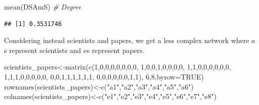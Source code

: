 \documentclass[
  notitlepage,
  onecolumn,
  openany]{book}
\newenvironment{Shaded}{\begin{snugshade}}{\end{snugshade}}
\newcommand{\AttributeTok}[1]{\textcolor[rgb]{0.77,0.63,0.00}{#1}}
\newcommand{\CommentTok}[1]{\textcolor[rgb]{0.56,0.35,0.01}{\textit{#1}}}
\newcommand{\ConstantTok}[1]{\textcolor[rgb]{0.00,0.00,0.00}{#1}}
\newcommand{\DecValTok}[1]{\textcolor[rgb]{0.00,0.00,0.81}{#1}}
\newcommand{\FunctionTok}[1]{\textcolor[rgb]{0.00,0.00,0.00}{#1}}
\newcommand{\NormalTok}[1]{#1}
\newcommand{\OtherTok}[1]{\textcolor[rgb]{0.56,0.35,0.01}{#1}}
\newcommand{\StringTok}[1]{\textcolor[rgb]{0.31,0.60,0.02}{#1}}
\begin{document}
\begin{Shaded}
\begin{Highlighting}[]
\FunctionTok{mean}\NormalTok{(DSAmS) }\CommentTok{\# Degree}
\end{Highlighting}
\end{Shaded}

\begin{verbatim}
## [1] 0.3531746
\end{verbatim}

Considering instead scientists and papers, we get a less complex network where \(a\)s represent scientists and \(e\)s represent papers.

\begin{Shaded}
\begin{Highlighting}[]
\NormalTok{scientists\_papers}\OtherTok{\textless{}{-}}\FunctionTok{matrix}\NormalTok{(}\FunctionTok{c}\NormalTok{(}\DecValTok{1}\NormalTok{,}\DecValTok{0}\NormalTok{,}\DecValTok{0}\NormalTok{,}\DecValTok{0}\NormalTok{,}\DecValTok{0}\NormalTok{,}\DecValTok{0}\NormalTok{,}\DecValTok{0}\NormalTok{,}\DecValTok{0}\NormalTok{,}
                            \DecValTok{1}\NormalTok{,}\DecValTok{0}\NormalTok{,}\DecValTok{0}\NormalTok{,}\DecValTok{1}\NormalTok{,}\DecValTok{0}\NormalTok{,}\DecValTok{0}\NormalTok{,}\DecValTok{0}\NormalTok{,}\DecValTok{0}\NormalTok{,}
                            \DecValTok{1}\NormalTok{,}\DecValTok{1}\NormalTok{,}\DecValTok{0}\NormalTok{,}\DecValTok{0}\NormalTok{,}\DecValTok{0}\NormalTok{,}\DecValTok{0}\NormalTok{,}\DecValTok{0}\NormalTok{,}\DecValTok{0}\NormalTok{,}
                            \DecValTok{1}\NormalTok{,}\DecValTok{1}\NormalTok{,}\DecValTok{1}\NormalTok{,}\DecValTok{0}\NormalTok{,}\DecValTok{0}\NormalTok{,}\DecValTok{0}\NormalTok{,}\DecValTok{0}\NormalTok{,}\DecValTok{0}\NormalTok{,}
                            \DecValTok{0}\NormalTok{,}\DecValTok{0}\NormalTok{,}\DecValTok{1}\NormalTok{,}\DecValTok{1}\NormalTok{,}\DecValTok{1}\NormalTok{,}\DecValTok{1}\NormalTok{,}\DecValTok{1}\NormalTok{,}\DecValTok{1}\NormalTok{,}
                            \DecValTok{0}\NormalTok{,}\DecValTok{0}\NormalTok{,}\DecValTok{0}\NormalTok{,}\DecValTok{0}\NormalTok{,}\DecValTok{0}\NormalTok{,}\DecValTok{0}\NormalTok{,}\DecValTok{1}\NormalTok{,}\DecValTok{1}\NormalTok{),}
                          \DecValTok{6}\NormalTok{,}\DecValTok{8}\NormalTok{,}\AttributeTok{byrow=}\ConstantTok{TRUE}\NormalTok{)}
\FunctionTok{rownames}\NormalTok{(scientists\_papers)}\OtherTok{\textless{}{-}}\FunctionTok{c}\NormalTok{(}\StringTok{"a1"}\NormalTok{,}\StringTok{"a2"}\NormalTok{,}\StringTok{"a3"}\NormalTok{,}\StringTok{"a4"}\NormalTok{,}\StringTok{"a5"}\NormalTok{,}\StringTok{"a6"}\NormalTok{)}
\FunctionTok{colnames}\NormalTok{(scientists\_papers)}\OtherTok{\textless{}{-}}\FunctionTok{c}\NormalTok{(}\StringTok{"e1"}\NormalTok{,}\StringTok{"e2"}\NormalTok{,}\StringTok{"e3"}\NormalTok{,}\StringTok{"e4"}\NormalTok{,}\StringTok{"e5"}\NormalTok{,}\StringTok{"e6"}\NormalTok{,}\StringTok{"e7"}\NormalTok{,}\StringTok{"e8"}\NormalTok{)}


\end{Highlighting}
\end{Shaded}
\end{document}
